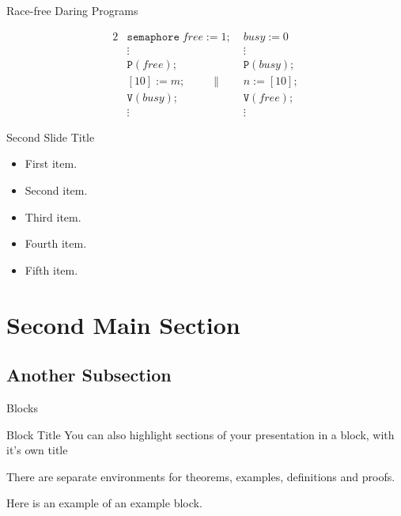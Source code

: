 \documentclass{beamer}
\begin{document}
\begin{frame}{Race-free Daring Programs}
  \begin{example}
    \begin{alignat*}{2}
      &\mathtt{semaphore}\; free := 1;\; &busy := 0 \\
      &\vdots            &\vdots \\
      &\mathtt{P}(free); &\mathtt{P}(busy); \\
      &[10] := m; \qquad\; \|     &n := [10]; \\
      &\mathtt{V}(busy); &\mathtt{V}(free); \\
      &\vdots            &\vdots
    \end{alignat*}
  \end{example}
\end{frame}

\begin{frame}{Second Slide Title}
  \begin{itemize}
  \item {
    First item.
    \pause %
  }
  \item {
    Second item.
  }
  \item<3-> {
    Third item.
  }
  \item<4-> {
    Fourth item.
  }
  \item<5-> {
    Fifth item. 
  }
  \end{itemize}
\end{frame}

\section{Second Main Section}

\subsection{Another Subsection}

\begin{frame}{Blocks}
\begin{block}{Block Title}
You can also highlight sections of your presentation in a block, with it's own title
\end{block}
\begin{theorem}
There are separate environments for theorems, examples, definitions and proofs.
\end{theorem}
\begin{example}
Here is an example of an example block.
\end{example}
\end{frame}
\end{document}
